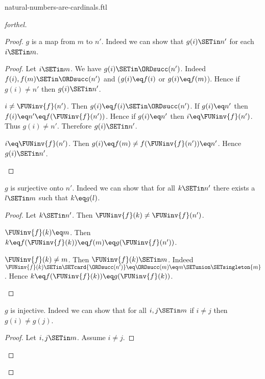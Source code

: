 \documentclass{naproche-library}
\begin{document}
\begin{smodule}[title=Natural Numbers are Cardinal Numbers]{natural-numbers-are-cardinals.ftl}
\begin{proof}[forthel]
\begin{proof}
      $g$ is a map from $m$ to $n'$.
      Indeed we can show that $g(i) \SETin n'$ for each $i \SETin m$.
      \begin{proof}
        Let $i \SETin m$.
        We have $g(i) \SETin \ORDsucc(n')$.
        Indeed $f(i), f(m) \SETin \ORDsucc(n')$ and ($g(i) \eq f(i)$ or $g(i) \eq f(m)$).
        Hence if $g(i) \neq n'$ then $g(i) \SETin n'$.

        \begin{case}{$i \neq \FUNinv{f}(n')$.}
          Then $g(i) \eq f(i) \SETin \ORDsucc(n')$.
          If $g(i) \eq n'$ then $f(i) \eq n' \eq f(\FUNinv{f}(n'))$.
          Hence if $g(i) \eq n'$ then $i \eq \FUNinv{f}(n')$.
          Thus $g(i) \neq n'$.
          Therefore $g(i) \SETin n'$.
        \end{case}

        \begin{case}{$i \eq \FUNinv{f}(n')$.}
          Then $g(i)
            \eq f(m)
            \neq f(\FUNinv{f}(n'))
            \eq n'$.
          Hence $g(i) \SETin n'$.
        \end{case}
      \end{proof}

      $g$ is surjective onto $n'$.
      Indeed we can show that for all $k \SETin n'$ there exists a $l \SETin m$ such that $k \eq g(l)$.
      \begin{proof}
        Let $k \SETin n'$.
        Then $\FUNinv{f}(k) \neq \FUNinv{f}(n')$.

        \begin{case}{$\FUNinv{f}(k) \eq m$.}
          Then $k
            \eq f(\FUNinv{f}(k))
            \eq f(m)
            \eq g(\FUNinv{f}(n'))$.
        \end{case}

        \begin{case}{$\FUNinv{f}(k) \neq m$.}
          Then $\FUNinv{f}(k) \SETin m$.
          Indeed $\FUNinv{f}(k) \SETin \SETcard{\ORDsucc(n')} \eq \ORDsucc(m) \eq m \SETunion \SETsingleton{m}$.
          Hence $k
            \eq f(\FUNinv{f}(k))
            \eq g(\FUNinv{f}(k))$.
        \end{case}
      \end{proof}

      $g$ is injective.
      Indeed we can show that for all $i, j \SETin m$ if $i \neq j$ then $g(i) \neq g(j)$.
      \begin{proof}
        Let $i, j \SETin m$.
        Assume $i \neq j$.


\end{proof}
\end{proof}
\end{proof}
\end{smodule}
\end{document}
